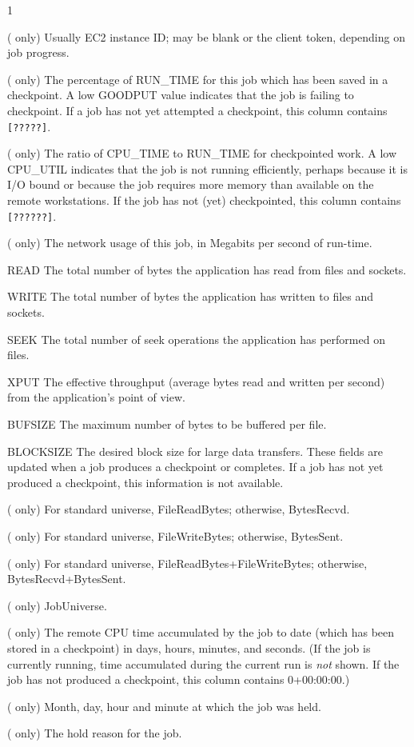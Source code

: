 \begin{ManPage}{\label{man-condor-q}}{1}
\begin{description}
\item[INSTANCE ID] ( only) Usually EC2 instance ID; may be blank or the client token, depending on job progress.
\item[GOODPUT] ( only) The percentage of RUN\_TIME for this job which has been
  saved in a checkpoint.  A low GOODPUT value indicates that the job is
  failing to checkpoint.  If a job has not yet attempted a checkpoint,
  this column contains \texttt{[?????]}.
\item[CPU\_UTIL] ( only) The ratio of CPU\_TIME to RUN\_TIME for checkpointed
  work.  A low CPU\_UTIL indicates that the job is not running
  efficiently, perhaps because it is I/O bound or because the job
  requires more memory than available on the remote workstations.  If
  the job has not (yet) checkpointed, this column contains \texttt{[??????]}.
\item[Mb/s] ( only) The network usage of this job, in
  Megabits per second of run-time.
  \item{READ} The total number of bytes the application has read from
    files and sockets.
  \item{WRITE} The total number of bytes the application has written to
    files and sockets.
  \item{SEEK} The total number of seek operations the application has
    performed on files.
  \item{XPUT} The effective throughput (average bytes read and written
    per second)
  from the application's point of view.
  \item{BUFSIZE} The maximum number of bytes to be buffered per file.
  \item{BLOCKSIZE} The desired block size for large data transfers.
    These fields are updated when a job produces a checkpoint or completes.
    If a job has not yet produced a checkpoint, this information is not
    available.
\item[INPUT] ( only) For standard universe, FileReadBytes;
    otherwise, BytesRecvd.
\item[OUTPUT] ( only) For standard universe, FileWriteBytes;
    otherwise, BytesSent.
\item[RATE] ( only) For standard universe,
    FileReadBytes+FileWriteBytes; otherwise, BytesRecvd+BytesSent.
\item[MISC] ( only) JobUniverse.
\item[CPU\_TIME] ( only) The remote CPU time accumulated by
  the job to date
  (which has been stored in a checkpoint) in days, hours, minutes, and
  seconds.  (If the job is currently running, time accumulated during
  the current run is \emph{not} shown.  If the job has not produced a
  checkpoint, this column contains 0+00:00:00.)
\item[HELD\_SINCE] ( only) Month, day, hour and minute
  at which the job was held.
\item[HOLD\_REASON] ( only) The hold reason for the job.
\end{description}


\end{ManPage}
